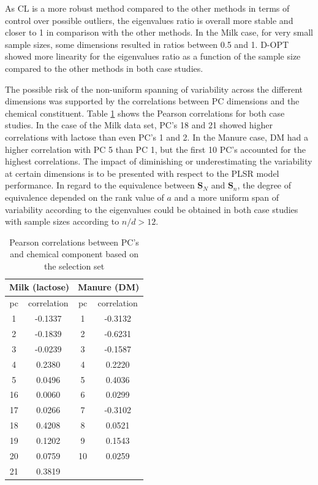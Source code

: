 \documentclass[journal=ancham,manuscript=article]{achemso}
\begin{document}
As CL is a more robust method compared to the other methods in terms of control over possible outliers, the eigenvalues ratio is overall more stable and closer to 1 in comparison with the other methods. In the Milk case, for very small sample sizes, some dimensions resulted in ratios between 0.5 and 1. D-OPT showed more linearity for the eigenvalues ratio as a function of the sample size compared to the other methods in both case studies. 

The possible risk of the non-uniform spanning of variability across the different dimensions was supported by the correlations between PC dimensions and the chemical constituent. Table \ref{tab_correlations} shows the Pearson correlations for both case studies. In the case of the Milk data set, PC's 18 and 21 showed higher correlations with lactose than even PC's 1 and 2. In the Manure case, DM had a higher correlation with PC 5 than PC 1, but the first 10 PC's accounted for the highest correlations. The impact of diminishing or underestimating the variability at certain dimensions is to be presented with respect to the PLSR model performance. In regard to the equivalence between $\mathbf{S}_N$ and $\mathbf{S}_n$, the degree of equivalence depended on the rank value of $a$ and a more uniform span of variability according to the eigenvalues could be obtained in both case studies with sample sizes according to $n/d>12$.  

\begin{table}[t]
\centering
\begin{tabular}{|cc|cc|} 
\hline
\multicolumn{2}{|c|}{Milk (lactose)} & \multicolumn{2}{|c|}{Manure (DM)}\\
\hline
pc	& correlation	&  pc & correlation	\\
\hline
  1 & -0.1337 & 1 & -0.3132 \\
  2 & -0.1839 & 2 & -0.6231 \\
  3 & -0.0239 & 3 & -0.1587 \\
  4 &  0.2380 & 4 &  0.2220 \\
  5 &  0.0496 & 5 &  0.4036 \\
 16 &  0.0060 & 6 &  0.0299 \\
 17 &  0.0266 & 7 & -0.3102 \\
 18 &  0.4208 & 8 & 0.0521 \\
 19 &  0.1202 & 9 & 0.1543 \\
 20 &  0.0759 & 10& 0.0259 \\
 21 &  0.3819 &  & \\
 \hline
\end{tabular}
\caption{Pearson correlations between PC's and chemical component based on the selection set}
\label{tab_correlations}
\end{table}
\end{document}
